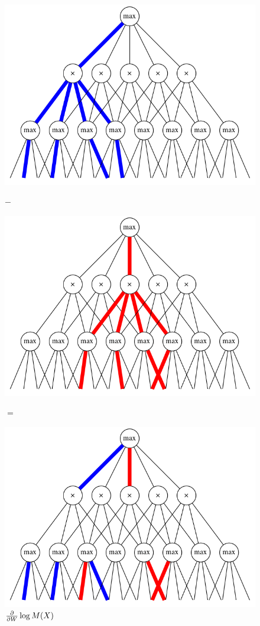 \begin{figure}[h]
  \centering
  \begin{minipage}{0.3\textwidth}
    \includegraphics[width=\linewidth]{graphs/hard_diff_0.png}
    \caption*{$\ddspn{}{W}\log M(Y,X)$}
  \end{minipage}
  $-$
  \begin{minipage}{0.3\textwidth}
    \includegraphics[width=\linewidth]{graphs/hard_diff_1.png}
    \caption*{$\frac{\partial}{\partial W}\log M(X)$}
  \end{minipage}
  $=$
  \begin{minipage}{0.3\textwidth}
    \includegraphics[width=\linewidth]{graphs/hard_diff_2.png}

\end{minipage}
\end{figure}
